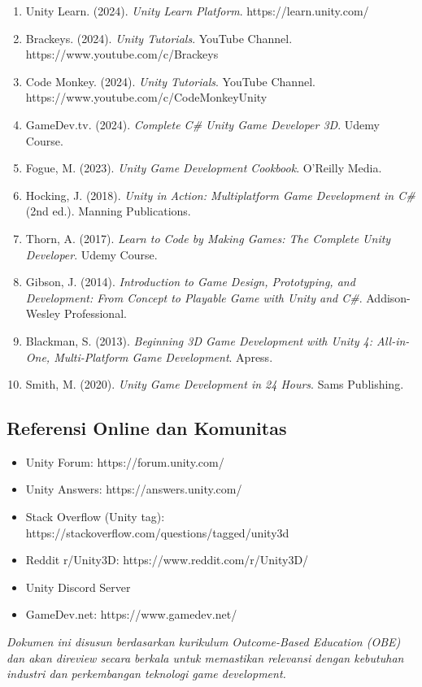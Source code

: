 \documentclass[a4paper,12pt]{article}
\begin{document}
\begin{enumerate}
\item Unity Learn. (2024). \textit{Unity Learn Platform}. https://learn.unity.com/

\item Brackeys. (2024). \textit{Unity Tutorials}. YouTube Channel. https://www.youtube.com/c/Brackeys

\item Code Monkey. (2024). \textit{Unity Tutorials}. YouTube Channel. https://www.youtube.com/c/CodeMonkeyUnity

\item GameDev.tv. (2024). \textit{Complete C\# Unity Game Developer 3D}. Udemy Course.

\item Fogue, M. (2023). \textit{Unity Game Development Cookbook}. O'Reilly Media.

\item Hocking, J. (2018). \textit{Unity in Action: Multiplatform Game Development in C\#} (2nd ed.). Manning Publications.

\item Thorn, A. (2017). \textit{Learn to Code by Making Games: The Complete Unity Developer}. Udemy Course.

\item Gibson, J. (2014). \textit{Introduction to Game Design, Prototyping, and Development: From Concept to Playable Game with Unity and C\#}. Addison-Wesley Professional.

\item Blackman, S. (2013). \textit{Beginning 3D Game Development with Unity 4: All-in-One, Multi-Platform Game Development}. Apress.

\item Smith, M. (2020). \textit{Unity Game Development in 24 Hours}. Sams Publishing.
\end{enumerate}

\subsection{Referensi Online dan Komunitas}

\begin{itemize}
\item Unity Forum: https://forum.unity.com/
\item Unity Answers: https://answers.unity.com/
\item Stack Overflow (Unity tag): https://stackoverflow.com/questions/tagged/unity3d
\item Reddit r/Unity3D: https://www.reddit.com/r/Unity3D/
\item Unity Discord Server
\item GameDev.net: https://www.gamedev.net/
\end{itemize}

\vspace{2cm}

\begin{center}
\textit{Dokumen ini disusun berdasarkan kurikulum Outcome-Based Education (OBE) dan akan direview secara berkala untuk memastikan relevansi dengan kebutuhan industri dan perkembangan teknologi game development.}
\end{center}
\end{document}

